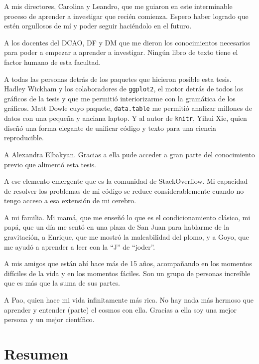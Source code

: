 \documentclass[spanish,a4paper,12pt,oneside]{book}
\begin{document}
A mis directores, Carolina y Leandro, que me guiaron en este
interminable proceso de aprender a investigar que recién comienza.
Espero haber logrado que estén orgullosos de mí y poder seguir
haciéndolo en el futuro.

A los docentes del DCAO, DF y DM que me dieron los conocimientos
necesarios para poder a empezar a aprender a investigar. Ningún libro de
texto tiene el factor humano de esta facultad.

A todas las personas detrás de los paquetes que hicieron posible esta
tesis. Hadley Wickham y los colaboradores de \texttt{ggplot2}, el motor
detrás de todos los gráficos de la tesis y que me permitió
interiorizarme con la gramática de los gráficos. Matt Dowle cuyo
paquete, \texttt{data.table} me permitió analizar millones de datos con
una pequeña y anciana laptop. Y al autor de \texttt{knitr}, Yihui Xie,
quien diseñó una forma elegante de unificar código y texto para una
ciencia reproducible.

A Alexandra Elbakyan. Gracias a ella pude acceder a gran parte del
conocimiento previo que alimentó esta tesis.

A ese elemento emergente que es la comunidad de StackOverflow. Mi
capacidad de resolver los problemas de mi código se reduce
considerablemente cuando no tengo acceso a esa extensión de mi cerebro.

A mi familia. Mi mamá, que me enseñó lo que es el condicionamiento
clásico, mi papá, que un día me sentó en una plaza de San Juan para
hablarme de la gravitación, a Enrique, que me mostró la maleabilidad del
plomo, y a Goyo, que me ayudó a aprender a leer con la ``J'' de
``joder''.

A mis amigos que están ahí hace más de 15 años, acompañando en los
momentos difíciles de la vida y en los momentos fáciles. Son un grupo de
personas increíble que es más que la suma de sus partes.

A Pao, quien hace mi vida infinitamente más rica. No hay nada más
hermoso que aprender y entender (parte) el cosmos con ella. Gracias a
ella soy una mejor persona y un mejor científico.

\newpage

 \chapter*{Resumen}
\end{document}
